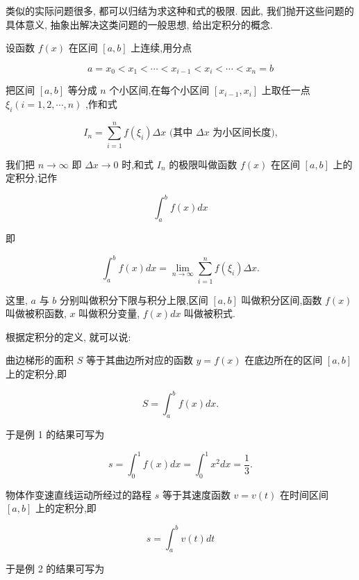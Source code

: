 \documentclass[lang=cn,newtx,12pt,scheme=chinese]{elegantbook}
\begin{document}
类似的实际问题很多, 都可以归结为求这种和式的极限. 因此, 我们抛开这些问题的具体意义, 抽象出解决这类问题的一般思想, 给出定积分的概念.
\begin{definition}[定积分]

设函数 \(f\left( x\right)\) 在区间 \(\left\lbrack {a,b}\right\rbrack\) 上连续,用分点

\[
a = {x}_{0} < {x}_{1} < \cdots < {x}_{i - 1} < {x}_{i} < \cdots < {x}_{n} = b
\]

把区间 \(\left\lbrack {a,b}\right\rbrack\) 等分成 \(n\) 个小区间,在每个小区间 \(\left\lbrack {{x}_{i - 1},{x}_{i}}\right\rbrack\) 上取任一点 \({\xi }_{i}\left( {i = 1,2,\cdots ,n}\right)\) ,作和式

\[
{I}_{n} = \mathop{\sum }\limits_{{i = 1}}^{n}f\left( {\xi }_{i}\right) {\Delta x}\text{ (其中 }{\Delta x}\text{ 为小区间长度),}
\]

我们把 \(n \rightarrow \infty\) 即 \({\Delta x} \rightarrow 0\) 时,和式 \({I}_{n}\) 的极限叫做函数 \(f\left( x\right)\) 在区间 \(\left\lbrack {a,b}\right\rbrack\) 上的定积分,记作

\[
{\int }_{a}^{b}f\left( x\right) {dx}
\]

即

\[
{\int }_{a}^{b}f\left( x\right) {dx} = \mathop{\lim }\limits_{{n \rightarrow \infty }}\mathop{\sum }\limits_{{i = 1}}^{n}f\left( {\xi }_{i}\right) {\Delta x}.
\]

这里, \(a\) 与 \(b\) 分别叫做积分下限与积分上限,区间 \(\left\lbrack {a,b}\right\rbrack\) 叫做积分区间,函数 \(f\left( x\right)\) 叫做被积函数, \(x\) 叫做积分变量, \(f\left( x\right) {dx}\) 叫做被积式.

\end{definition}

根据定积分的定义, 就可以说:

曲边梯形的面积 \(S\) 等于其曲边所对应的函数 \(y = f\left( x\right)\) 在底边所在的区间 \(\left\lbrack {a,b}\right\rbrack\) 上的定积分,即

\[
S = {\int }_{a}^{b}f\left( x\right) {dx}.
\]

于是例 1 的结果可写为

\[
s = {\int }_{0}^{1}f\left( x\right) {dx} = {\int }_{0}^{1}{x}^{2}{dx} = \frac{1}{3}.
\]

物体作变速直线运动所经过的路程 \(s\) 等于其速度函数 \(v = v\left( t\right)\) 在时间区间 \(\left\lbrack {a,b}\right\rbrack\) 上的定积分,即

\[
s = {\int }_{a}^{b}v\left( t\right) {dt}
\]

于是例 2 的结果可写为
\end{document}
